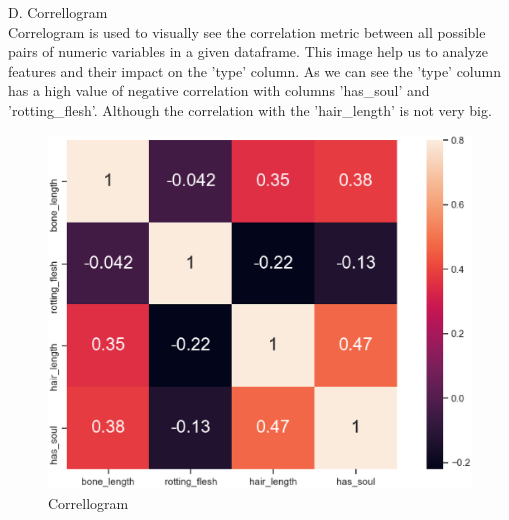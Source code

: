 \hspace*{0.4cm}D. Correllogram\\
\hspace*{0.4cm}Correlogram is used to visually see the correlation metric between all possible pairs of numeric variables in a given dataframe. This image help us to analyze features and their impact on the 'type' column. As we can see the 'type' column has a high value of negative correlation with columns 'has_soul' and 'rotting_flesh'. Although the correlation with the 'hair_length' is not very big.\\
\begin{figure}[h]\centering
	\includegraphics[scale=0.3]{7.eps}
	\caption{Correllogram}
\end{figure}



